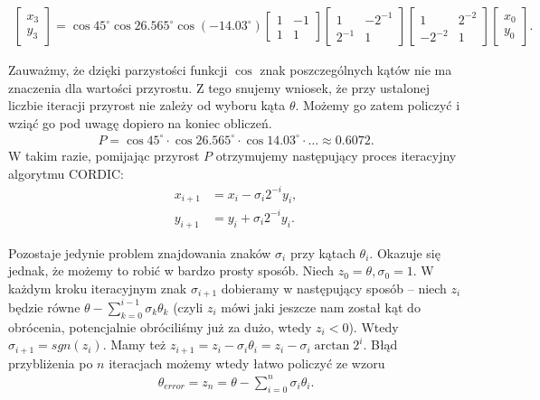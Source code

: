 \documentclass{mwart}
\theoremstyle{remark}
\theoremstyle{definition}
\theoremstyle{definition}
\begin{document}
\begin{align}
  \begin{bmatrix}
    x_3 \\ y_3
  \end{bmatrix}
  = \cos 45^{\circ}\cos 26.565^{\circ}\cos(-14.03^{\circ})
  \begin{bmatrix}
    1 & -1 \\
    1 & 1
  \end{bmatrix}
  \begin{bmatrix}
    1      & -2^{-1} \\
    2^{-1} & 1
  \end{bmatrix}
  \begin{bmatrix}
    1       & 2^{-2} \\
    -2^{-2} & 1
  \end{bmatrix}
  \begin{bmatrix}
    x_0 \\ y_0
  \end{bmatrix}.
\end{align}

Zauważmy, że dzięki parzystości funkcji $\cos$ znak poszczególnych kątów nie ma znaczenia dla wartości przyrostu. Z tego snujemy wniosek, że przy ustalonej liczbie iteracji przyrost nie zależy od wyboru kąta $\theta$. Możemy go zatem policzyć i wziąć go pod uwagę dopiero na koniec obliczeń.
\begin{align}
  P = \cos 45^{\circ}\cdot\cos 26.565^{\circ}\cdot\cos 14.03^{\circ}\cdot\ldots \approx 0.6072.
\end{align}
W takim razie, pomijając przyrost $P$ otrzymujemy następujący proces iteracyjny algorytmu CORDIC:
\begin{align}
  x_{i + 1} & = x_{i} - \sigma_i 2^{-i}y_i, \\
  y_{i + 1} & = y_i + \sigma_i 2^{-i}y_i.
\end{align}

Pozostaje jedynie problem znajdowania znaków $\sigma_i$ przy kątach $\theta_i$. Okazuje się jednak, że możemy to robić w bardzo prosty sposób. Niech $z_0 = \theta, \sigma_0 = 1$. W każdym kroku iteracyjnym znak $\sigma_{i + 1}$ dobieramy w następujący sposób -- niech $z_{i}$ będzie równe $\theta - \sum_{k=0}^{i - 1}\sigma_k\theta_k$ (czyli $z_i$ mówi jaki jeszcze nam został kąt do obrócenia, potencjalnie obróciliśmy już za dużo, wtedy $z_i < 0$). Wtedy $\sigma_{i + 1} = sgn(z_i)$. Mamy też $z_{i + 1} = z_{i} - \sigma_i\theta_i = z_{i} - \sigma_i\arctan{2^{i}}$. Błąd przybliżenia po $n$ iteracjach możemy wtedy łatwo policzyć ze wzoru 
\begin{align}
  \theta_{error} = z_n = \theta - \sum_{i=0}^n\sigma_i \theta_i.
\end{align}
\end{document}
